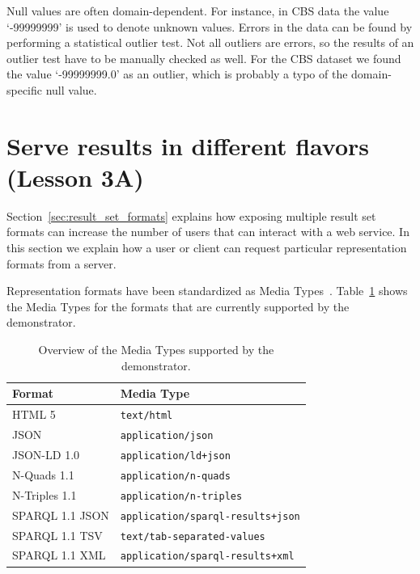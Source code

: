 \documentclass[a4paper]{scrartcl}
\newcommand{\textt}[1]{{\small \texttt{#1}}}
\begin{document}
Null values are often domain-dependent.  For instance, in CBS data the
value `-99999999' is used to denote unknown values.  Errors in the
data can be found by performing a statistical outlier test.  Not all
outliers are errors, so the results of an outlier test have to be
manually checked as well.  For the CBS dataset we found the value
`-99999999.0' as an outlier, which is probably a typo of the
domain-specific null value.



\section{Serve results in different flavors (Lesson 3A)}

Section~\ref{sec:result_set_formats} explains how exposing multiple
result set formats can increase the number of users that can interact
with a web service.  In this section we explain how a user or client
can request particular representation formats from a server.

Representation formats have been standardized as Media
Types~\cite{RFC6838}.  Table~\ref{tab:media_type} shows the Media
Types for the formats that are currently supported by the
demonstrator.

\begin{table}
  \begin{tabular}{|l|l|}
    \hline
    \textbf{Format} & \textbf{Media Type} \\
    \hline
    \hline
    HTML 5          & \textt{text/html} \\
    \hline
    JSON            & \textt{application/json} \\
    \hline
    JSON-LD 1.0     & \textt{application/ld+json} \\
    \hline
    N-Quads 1.1     & \textt{application/n-quads} \\
    \hline
    N-Triples 1.1   & \textt{application/n-triples} \\
    \hline
    SPARQL 1.1 JSON & \textt{application/sparql-results+json} \\
    \hline
    SPARQL 1.1 TSV  & \textt{text/tab-separated-values} \\
    \hline
    SPARQL 1.1 XML  & \textt{application/sparql-results+xml} \\
    \hline
  \end{tabular}
  \caption{Overview of the Media Types supported by the demonstrator.}
  \label{tab:media_type}
\end{table}
\end{document}
